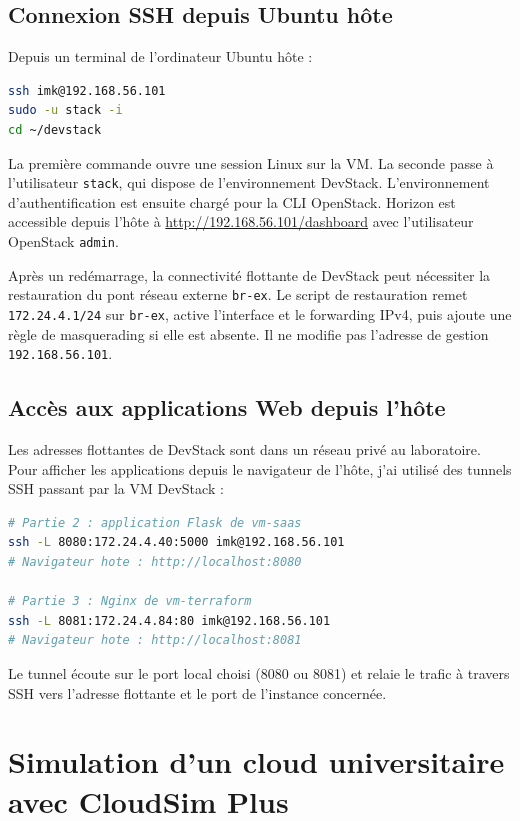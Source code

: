 \documentclass[11pt,a4paper]{article}
\begin{document}
\subsection{Connexion SSH depuis Ubuntu hôte}
Depuis un terminal de l'ordinateur Ubuntu hôte :
\begin{lstlisting}[language=bash]
ssh imk@192.168.56.101
sudo -u stack -i
cd ~/devstack
\end{lstlisting}

La première commande ouvre une session Linux sur la VM. La seconde passe à l'utilisateur \texttt{stack}, qui dispose de l'environnement DevStack. L'environnement d'authentification est ensuite chargé pour la CLI OpenStack. Horizon est accessible depuis l'hôte à \url{http://192.168.56.101/dashboard} avec l'utilisateur OpenStack \texttt{admin}.

Après un redémarrage, la connectivité flottante de DevStack peut nécessiter la restauration du pont réseau externe \texttt{br-ex}. Le script de restauration remet \texttt{172.24.4.1/24} sur \texttt{br-ex}, active l'interface et le forwarding IPv4, puis ajoute une règle de masquerading si elle est absente. Il ne modifie pas l'adresse de gestion \texttt{192.168.56.101}.

\subsection{Accès aux applications Web depuis l'hôte}\label{sec:tunnels}
Les adresses flottantes de DevStack sont dans un réseau privé au laboratoire. Pour afficher les applications depuis le navigateur de l'hôte, j'ai utilisé des tunnels SSH passant par la VM DevStack :
\begin{lstlisting}[language=bash]
# Partie 2 : application Flask de vm-saas
ssh -L 8080:172.24.4.40:5000 imk@192.168.56.101
# Navigateur hote : http://localhost:8080

# Partie 3 : Nginx de vm-terraform
ssh -L 8081:172.24.4.84:80 imk@192.168.56.101
# Navigateur hote : http://localhost:8081
\end{lstlisting}

Le tunnel écoute sur le port local choisi (8080 ou 8081) et relaie le trafic à travers SSH vers l'adresse flottante et le port de l'instance concernée.

\clearpage

\section{Simulation d'un cloud universitaire avec CloudSim Plus}
\end{document}

